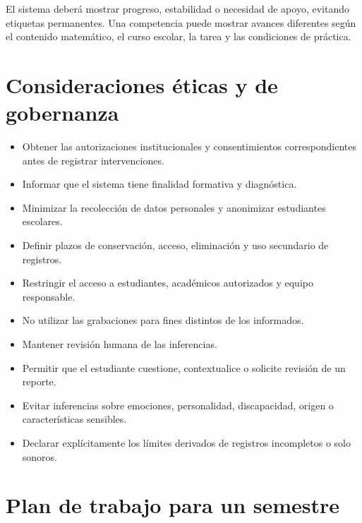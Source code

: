 \documentclass[11pt,a4paper]{article}
\begin{document}
El sistema deberá mostrar progreso, estabilidad o necesidad de apoyo, evitando etiquetas permanentes. Una competencia puede mostrar avances diferentes según el contenido matemático, el curso escolar, la tarea y las condiciones de práctica.

\section{Consideraciones éticas y de gobernanza}

\begin{itemize}
    \item Obtener las autorizaciones institucionales y consentimientos correspondientes antes de registrar intervenciones.
    \item Informar que el sistema tiene finalidad formativa y diagnóstica.
    \item Minimizar la recolección de datos personales y anonimizar estudiantes escolares.
    \item Definir plazos de conservación, acceso, eliminación y uso secundario de registros.
    \item Restringir el acceso a estudiantes, académicos autorizados y equipo responsable.
    \item No utilizar las grabaciones para fines distintos de los informados.
    \item Mantener revisión humana de las inferencias.
    \item Permitir que el estudiante cuestione, contextualice o solicite revisión de un reporte.
    \item Evitar inferencias sobre emociones, personalidad, discapacidad, origen o características sensibles.
    \item Declarar explícitamente los límites derivados de registros incompletos o solo sonoros.
\end{itemize}

\section{Plan de trabajo para un semestre}
\end{document}
